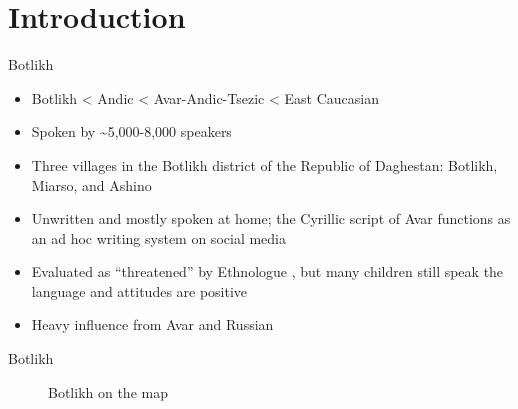  



\begin{frame}
\titlepage
\end{frame}

\section{Introduction}
\begin{frame}{Botlikh}
    \begin{itemize}
        \item Botlikh < Andic < Avar-Andic-Tsezic < East Caucasian
        \item Spoken by \textasciitilde{}5,000-8,000 speakers
        \item Three villages in the Botlikh district of the Republic of Daghestan: Botlikh, Miarso, and Ashino
        \item Unwritten and mostly spoken at home; the Cyrillic script of Avar functions as an ad hoc writing system on social media
        \item Evaluated as ``threatened'' by Ethnologue \citep{simonsfenning2018}, but many children still speak the language and attitudes are positive
        \item Heavy influence from Avar and Russian 
    \end{itemize}
\end{frame}

\begin{frame}{Botlikh}
\begin{figure}[h]
\centering
{}
\caption{Botlikh on the map}
\end{figure}
\end{frame}

